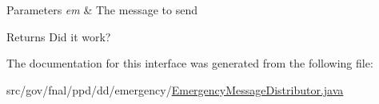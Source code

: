 \begin{DoxyParams}{Parameters}
{\em em} & The message to send \\
\hline
\end{DoxyParams}
\begin{DoxyReturn}{Returns}
Did it work? 
\end{DoxyReturn}


The documentation for this interface was generated from the following file\-:\begin{DoxyCompactItemize}
\item 
src/gov/fnal/ppd/dd/emergency/\hyperlink{EmergencyMessageDistributor_8java}{Emergency\-Message\-Distributor.\-java}\end{DoxyCompactItemize}
